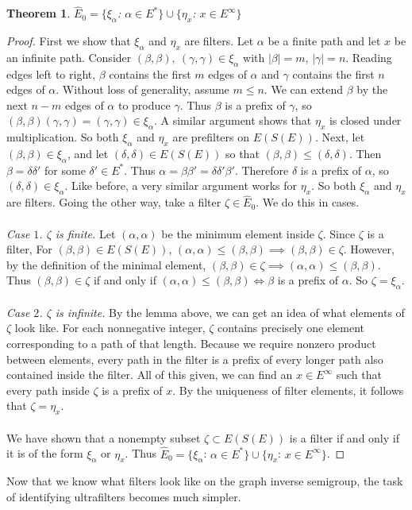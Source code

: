 \documentclass{article}
\newtheorem{theorem}{Theorem}[section]
\theoremstyle{definition}
\begin{document}
\begin{theorem} $\hat{E}_0 = \{\xi_\alpha$: $\alpha \in E^*\} \cup \{\eta_x$: $x \in E^\infty\}$ \end{theorem}
\begin{proof}
    First we show that $\xi_\alpha$ and $\eta_x$ are filters. Let $\alpha$ be a finite path and let $x$ be an infinite path.
    Consider $(\beta, \beta), \ (\gamma, \gamma) \in \xi_\alpha$ with $|\beta| = m$, $|\gamma| = n$. 
    Reading edges left to right, $\beta$ contains the first $m$ edges of $\alpha$ and $\gamma$ 
    contains the first $n$ edges of $\alpha$. Without loss of generality, assume $m \leq n$. 
    We can extend $\beta$ by the next $n - m$ edges of $\alpha$ to produce $\gamma$. Thus
    $\beta$ is a prefix of $\gamma$, so $(\beta, \beta)(\gamma, \gamma) = (\gamma, \gamma) \in \xi_\alpha$.
    A similar argument shows that $\eta_x$ is closed under multiplication. So both $\xi_\alpha$ and $\eta_x$ are prefilters
    on $E(S(E))$. Next, let $(\beta, \beta) \in \xi_\alpha$, and let $(\delta, \delta) \in E(S(E))$ so that 
    $(\beta, \beta) \leq (\delta, \delta)$. Then $\beta = \delta \delta'$ for some $\delta' \in E^*$. 
    Thus $\alpha = \beta \beta' = \delta \delta' \beta'$. Therefore $\delta$ is a prefix of $\alpha$, so 
    $(\delta, \delta) \in \xi_\alpha$. Like before, a very similar argument works for $\eta_x$. So both 
    $\xi_\alpha$ and $\eta_x$ are filters. Going the other way, take a filter $\zeta \in \hat{E}_0$.
    We do this in cases.
    \\ \\
    \textit{Case $1$. $\zeta$ is finite.}
    Let $(\alpha, \alpha)$ be the minimum element inside $\zeta$. Since $\zeta$ is a filter,
    For $(\beta, \beta) \in E(S(E))$, $(\alpha, \alpha) \leq (\beta, \beta) \implies (\beta, \beta) \in \zeta$.
    However, by the definition of the minimal element, $(\beta, \beta) \in \zeta \implies (\alpha, \alpha) \leq (\beta, \beta)$.
    Thus $(\beta, \beta) \in \zeta$ if and only if $(\alpha, \alpha) \leq (\beta, \beta) \iff \beta$ is a prefix of $\alpha$. So $\zeta = \xi_\alpha$.
    \\ \\
    \textit{Case $2$. $\zeta$ is infinite.}
    By the lemma above, we can get an idea of what elements of $\zeta$ look like.
    For each nonnegative integer, $\zeta$ contains precisely one element corresponding
    to a path of that length. Because we require nonzero product between elements, every
    path in the filter is a prefix of every longer path also contained inside the filter.
    All of this given, we can find an $x \in E^\infty$ such that every path inside $\zeta$
    is a prefix of $x$. By the uniqueness of filter elements, it follows that $\zeta = \eta_x$.
    \\ \\
    We have shown that a nonempty subset $\zeta \subset E(S(E))$ is a filter if and only if
    it is of the form $\xi_\alpha$ or $\eta_x$. Thus $\hat{E}_0 = \{\xi_\alpha$: $\alpha \in E^*\} \cup \{\eta_x$: $x \in E^\infty\}$.
\end{proof}
Now that we know what filters look like on the graph inverse semigroup, the task of identifying ultrafilters becomes much simpler.
\end{document}
